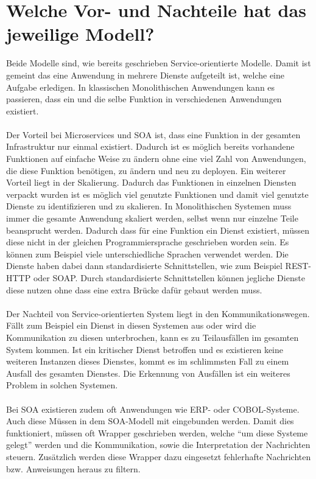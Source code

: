 \section{Welche Vor- und Nachteile hat das jeweilige Modell?}
\label{sec:VorNachteile}
Beide Modelle sind, wie bereits geschrieben Service-orientierte Modelle. Damit ist gemeint das eine Anwendung in mehrere Dienste aufgeteilt ist, welche eine Aufgabe erledigen. In klassischen Monolithischen Anwendungen kann es passieren, dass ein und die selbe Funktion in verschiedenen Anwendungen existiert.
\\\\
Der Vorteil bei Microservices und SOA ist, dass eine Funktion in der gesamten Infrastruktur nur einmal existiert. Dadurch ist es möglich bereits vorhandene Funktionen auf einfache Weise zu ändern ohne eine viel Zahl von Anwendungen, die diese Funktion benötigen, zu ändern und neu zu deployen.
Ein weiterer Vorteil liegt in der Skalierung. Dadurch das Funktionen in einzelnen Diensten verpackt wurden ist es möglich viel genutzte Funktionen und damit viel genutzte Dienste zu identifizieren und zu skalieren. In Monolithischen Systemen muss immer die gesamte Anwendung skaliert werden, selbst wenn nur einzelne Teile beansprucht werden.
Dadurch dass für eine Funktion ein Dienst existiert, müssen diese nicht in der gleichen Programmiersprache geschrieben worden sein. Es können zum Beispiel viele unterschiedliche Sprachen verwendet werden. Die Dienste haben dabei dann standardisierte Schnittstellen, wie zum Beispiel REST-HTTP oder SOAP. Durch standardisierte Schnittstellen können jegliche Dienste diese nutzen ohne dass eine extra Brücke dafür gebaut werden muss.
\\\\
Der Nachteil von Service-orientierten System liegt in den Kommunikationswegen. Fällt zum Beispiel ein Dienst in diesen Systemen aus oder wird die Kommunikation zu diesen unterbrochen, kann es zu Teilausfällen im gesamten System kommen. Ist ein kritischer Dienst betroffen und es existieren keine weiteren Instanzen dieses Dienstes, kommt es im schlimmsten Fall zu einem Ausfall des gesamten Dienstes. Die Erkennung von Ausfällen ist ein weiteres Problem in solchen Systemen.
\\\\
Bei SOA existieren zudem oft Anwendungen wie ERP- oder COBOL-Systeme. Auch diese Müssen in dem SOA-Modell mit eingebunden werden. Damit dies funktioniert, müssen oft Wrapper geschrieben werden, welche "`um diese Systeme gelegt"' werden und die Kommunikation, sowie die Interpretation der Nachrichten steuern. Zusätzlich werden diese Wrapper dazu eingesetzt fehlerhafte Nachrichten bzw. Anweisungen heraus zu filtern.

